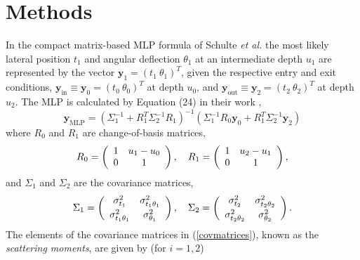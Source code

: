 \documentclass[preprint,times]{elsarticle}
\newcommand{\Eqn}[1]{(#1)} %
\begin{document}
\section{Methods}

In the compact matrix-based MLP formula of Schulte 
\emph{et al.} \citep{penfoldMLP} the most likely lateral position $t_1$ and angular deflection $\theta_1$ at an intermediate depth $u_1$ are represented by the vector $\mathbf{y}_1 = \left( t_1 \ \theta_1 \right)^T$,
given the respective entry and exit conditions,
$\mathbf{y}_{\mathrm{in}} \equiv \mathbf{y}_0 = \left( t_0 \ \theta_0 \right)^T$ at depth $u_0$, and $\mathbf{y}_{\mathrm{out}} \equiv \mathbf{y}_2 = \left( t_2 \ \theta_2 \right)^T$ at depth $u_2$.
The MLP is calculated by Equation (24) in their work \citep{penfoldMLP},
\begin{equation}
\mathbf{y}_{\mathrm{MLP}} = \left( \Sigma_1^{-1} + R_1^T\Sigma_{2}^{-1}R_1 \right)^{-1}\left( \Sigma_1^{-1}R_{0}\mathbf{y}_{0} + R_1^T\Sigma_{2}^{-1}\mathbf{y}_{2} \right) \label{mlp}
\end{equation}
where $R_0$ and $R_1$ are change-of-basis matrices,
\begin{equation}
R_0 = 
\left(
\begin{array}{c c}
1 & u_{1} - u_0 \\
0 & 1
\end{array}
\right), \ \ \ 
R_1 = 
\left(
\begin{array}{c c}
1 & u_{2} - u_1 \\
0 & 1
\end{array}
\right), \label{changeofbasismatrices}
\end{equation}
and $\Sigma_1$ and $\Sigma_2$ are the covariance matrices,
\begin{equation}
\Sigma_1 = 
\left(
\begin{array}{c c}
\sigma^2_{t_1} & \sigma^2_{t_1\theta_1} \vspace{2px} \\
\sigma^2_{t_1\theta_1} & \sigma^2_{\theta_1} 
\end{array}
\right), \ \ \
\Sigma_2 = 
\left(
\begin{array}{c c}
\sigma^2_{t_2} & \sigma^2_{t_2\theta_2} \vspace{2px} \\
\sigma^2_{t_2\theta_2} & \sigma^2_{\theta_2} 
\end{array}
\right). \label{covmatrices}
\end{equation}
The elements of the covariance matrices in \Eqn{\ref{covmatrices}}, known as the \emph{scattering moments}, are given by (for $i=1,2$) \citep{Eyges1948}
\end{document}
